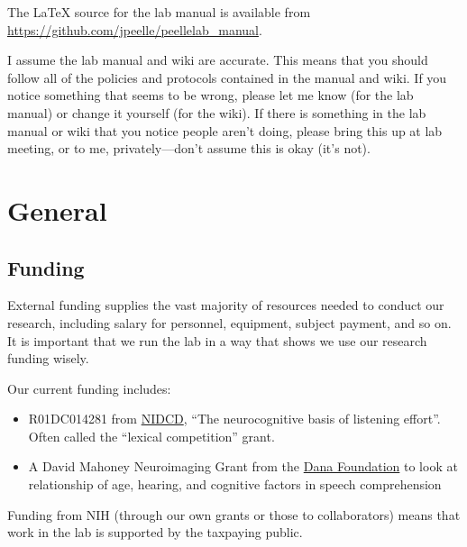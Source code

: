 \documentclass[letterpaper,12pt,oneside]{memoir}
\begin{document}
The LaTeX source for the lab manual is available from \url{https://github.com/jpeelle/peellelab_manual}.

 \begin{shaded}
\noindent I assume the lab manual and wiki are accurate. This means that you should follow all of the policies and protocols contained in the manual and wiki. If you notice something that seems to be wrong, please let me know (for the lab manual) or change it yourself (for the wiki). If there is something in the lab manual or wiki that you notice people aren't doing, please bring this up at lab meeting, or to me, privately---don't assume this is okay (it's not).
\end{shaded}


\chapter{General} %

\section{Funding}

External funding supplies the vast majority of resources needed to conduct our research, including salary for personnel, equipment, subject payment, and so on. It is important that we run the lab in a way that shows we use our research funding wisely.

Our current funding includes:

\begin{itemize}
\item{R01DC014281 from \href{http://www.nidcd.nih.gov}{NIDCD}, ``The neurocognitive basis of listening effort''. Often called the ``lexical competition'' grant.}
\item{A David Mahoney Neuroimaging Grant from the \href{http://dana.org}{Dana Foundation} to look at relationship of age, hearing, and cognitive factors in speech comprehension}
\end{itemize}

Funding from NIH (through our own grants or those to collaborators) means that work in the lab is supported by the taxpaying public.
\end{document}
